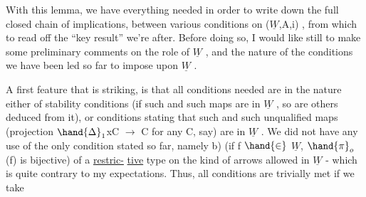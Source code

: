 With this lemma, we have everything needed in order to write down
the full closed chain of implications, between various conditions on
($\underline{W}$,A,i) , from which to read off the ``key result'' we're after. Before
doing so, I would like still to make some preliminary comments on the
role of $\underline{W}$ , and  the nature of the conditions we have been led so far to
impose upon $\underline{W}$ .

A first feature that is striking, is that all conditions needed
are in the nature either of stability conditions (if such and such maps
are in $\underline{W}$ , so are others deduced from it), or conditions stating that
such and such unqualified maps (projection $\hand{\Delta}_{1}$xC $\to$ C for any C,
say) are in $\underline{W}$ . We did not have any use of the only condition stated
so far, namely b) (if f $\hand{\in}$ $\underline{W}$, $\hand{\pi}_{o}$(f) is bijective)  of a \uline{restric-}%
\uline{tive} type on the kind of arrows allowed in $\underline{W}$ - which is quite contrary
to my expectations. Thus, all conditions are trivially met if we take

